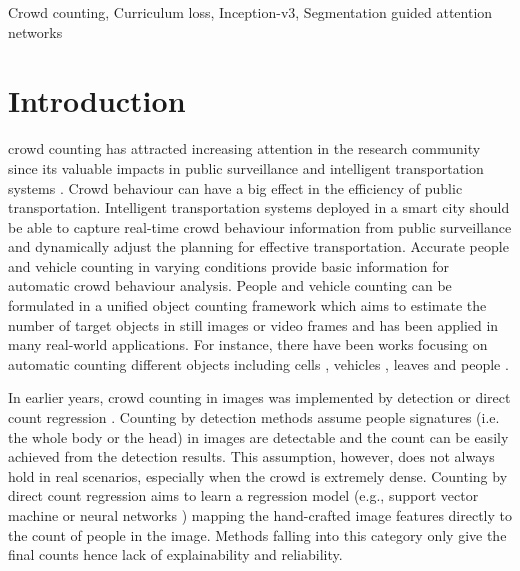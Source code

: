 \documentclass[journal,comsoc]{IEEEtran}
\begin{document}
\begin{IEEEkeywords}
Crowd counting, Curriculum loss, Inception-v3, Segmentation guided attention networks
\end{IEEEkeywords}

\IEEEpeerreviewmaketitle



\section{Introduction}
 crowd counting has attracted increasing attention in the research community since its valuable impacts in public surveillance and intelligent transportation systems \cite{zhou2018crowd,zhan2008crowd,ryan2015evaluation,sindagi2018survey,ding2020crowd}. Crowd behaviour can have a big effect in the efficiency of public transportation. Intelligent transportation systems deployed in a smart city should be able to capture real-time crowd behaviour information from public surveillance and dynamically adjust the planning for effective transportation. Accurate people and vehicle counting in varying conditions provide basic information for automatic crowd behaviour analysis. People and vehicle counting can be formulated in a unified object counting framework which aims to estimate the number of target objects in still images or video frames and has been applied in many real-world applications. For instance, there have been works focusing on automatic counting different objects including cells \cite{xie2018microscopy}, vehicles \cite{liang2015counting,moranduzzo2014automatic}, leaves \cite{giuffrida2016learning,aich2017leaf} and people \cite{sindagi2018survey}. 

In earlier years, crowd counting in images was implemented by detection \cite{zhao2003bayesian,dong2007fast,subburaman2012counting} or direct count regression \cite{kong2006viewpoint,siva2016real}. Counting by detection methods assume people signatures (i.e. the whole body or the head) in images are detectable and the count can be easily achieved from the detection results. This assumption, however, does not always hold in real scenarios, especially when the crowd is extremely dense. Counting by direct count regression aims to learn a regression model (e.g., support vector machine \cite{siva2016real} or neural networks \cite{kong2006viewpoint}) mapping the hand-crafted image features directly to the count of people in the image. Methods falling into this category only give the final counts hence lack of explainability and reliability.
\end{document}
